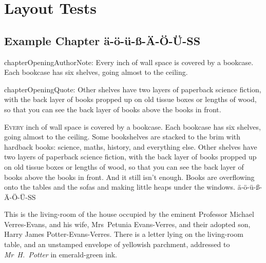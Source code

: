 
\RequirePackage[pdf]{layout/hp-book}











{
\pagestyle{empty}

\def\volumenumber{}
\def\volumetitle{Layout-Test vom \today{}}

% 

% 
\cleartorecto
}
\setcounter{page}{1}

\part{Layout Tests}


\chapter{Example Chapter ä-ö-ü-ß-Ä-Ö-Ü-SS}

\begin{chapterOpeningAuthorNote}
chapterOpeningAuthorNote: Every inch of wall space is covered by a bookcase. Each bookcase has six shelves, going almost to the ceiling.
\end{chapterOpeningAuthorNote}
\begin{chapterOpeningQuote}
chapterOpeningQuote: Other shelves have two layers of paperback science fiction, with the back layer of books propped up on old tissue boxes or lengths of wood, so that you can see the back layer of books above the books in front.
\end{chapterOpeningQuote}

\lettrine{E}{very} inch of wall space is covered by a bookcase. Each bookcase has six shelves, going almost to the ceiling. Some bookshelves are stacked to the brim with hardback books: science, maths, history, and everything else. Other shelves have two layers of paperback science fiction, with the back layer of books propped up on old tissue boxes or lengths of wood, so that you can see the back layer of books above the books in front. And it still isn’t enough. Books are overflowing onto the tables and the sofas and making little heaps under the windows.
ä-ö-ü-ß-Ä-Ö-Ü-SS

This is the living-room of the house occupied by the eminent Professor Michael Verres-Evans, and his wife, Mrs~Petunia Evans-Verres, and their adopted son, Harry James Potter-Evans-Verres. There is a letter lying on the living-room table, and an unstamped envelope of yellowish parchment, addressed to \emph{Mr~H.~Potter} in emerald-green ink.


